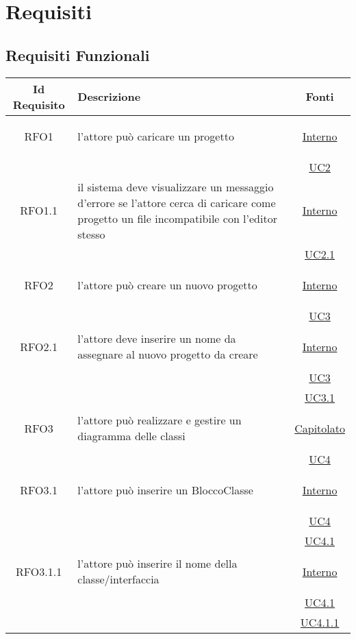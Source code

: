 
\section{Requisiti}

\subsection{Requisiti Funzionali}
\normalsize
\begin{longtable}{|c|>{\centering}m{7cm}|c|}
\hline
\textbf{Id Requisito} & \textbf{Descrizione} & \textbf{Fonti}\\
\hline
\endhead
\hypertarget{RFO1}{RFO1} & l'attore può caricare un progetto &  \hyperlink{Interno}{Interno}\\
& & \hyperref[UC2]{UC2}\\ \hline

\hypertarget{RFO1.1}{RFO1.1} & il sistema deve visualizzare un messaggio d'errore se l'attore cerca di caricare come progetto un file incompatibile con l'editor stesso &  \hyperlink{Interno}{Interno}\\
& & \hyperref[UC2.1]{UC2.1}\\ \hline

\hypertarget{RFO2}{RFO2} & l'attore può creare un nuovo progetto &  \hyperlink{Interno}{Interno}\\
& & \hyperref[UC3]{UC3}\\ \hline

\hypertarget{RFO2.1}{RFO2.1} & l'attore deve inserire un nome da assegnare al nuovo progetto da creare&  \hyperlink{Interno}{Interno}\\
& &\hyperref[UC3]{UC3}\\ 
& &\hyperref[UC3.1]{UC3.1}\\ \hline

\hypertarget{RFO3}{RFO3} & l'attore può realizzare e gestire un diagramma delle classi & \hyperlink{Capitolato}{Capitolato}\\
& & \hyperref[UC4]{UC4}\\ \hline

\hypertarget{RFO3.1}{RFO3.1} & l'attore può inserire un BloccoClasse &  \hyperlink{Interno}{Interno}\\
& &\hyperref[UC4]{UC4}\\
& &\hyperref[UC4.1]{UC4.1}\\ \hline

\hypertarget{RFO3.1.1}{RFO3.1.1} & l'attore può inserire il nome della classe/interfaccia & \hyperlink{Interno}{Interno}\\
& &\hyperref[UC4.1]{UC4.1}\\
& &\hyperref[UC4.1.1]{UC4.1.1}\\ \hline


\end{longtable}
